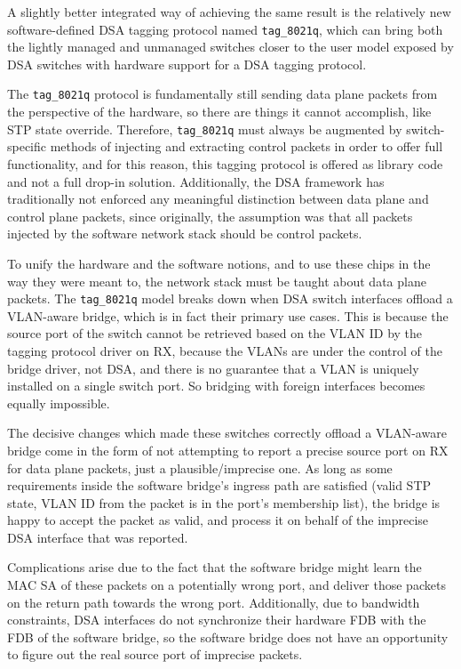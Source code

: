 \documentclass[letterpaper]{article}
\begin{document}
A slightly better integrated way of achieving the same result is the relatively
new software-defined DSA tagging protocol named \verb|tag_8021q|, which can
bring both the lightly managed and unmanaged switches closer to the user model
exposed by DSA switches with hardware support for a DSA tagging protocol.

The \verb|tag_8021q| protocol is fundamentally still sending data plane packets
from the perspective of the hardware, so there are things it cannot accomplish,
like STP state override. Therefore, \verb|tag_8021q| must always be augmented
by switch-specific methods of injecting and extracting control packets in order
to offer full functionality, and for this reason, this tagging protocol is
offered as library code and not a full drop-in solution. Additionally, the DSA
framework has traditionally not enforced any meaningful distinction between
data plane and control plane packets, since originally, the assumption was that
all packets injected by the software network stack should be control packets.

To unify the hardware and the software notions, and to use these chips in the
way they were meant to, the network stack must be taught about data plane
packets. The \verb|tag_8021q| model breaks down when DSA switch interfaces
offload a VLAN-aware bridge, which is in fact their primary use cases. This is
because the source port of the switch cannot be retrieved based on the VLAN ID
by the tagging protocol driver on RX, because the VLANs are under the control
of the bridge driver, not DSA, and there is no guarantee that a VLAN is
uniquely installed on a single switch port. So bridging with foreign interfaces
becomes equally impossible.

The decisive changes which made these switches correctly offload a VLAN-aware
bridge come in the form of not attempting to report a precise source port on RX
for data plane packets, just a plausible/imprecise one. As long as some
requirements inside the software bridge's ingress path are satisfied (valid STP
state, VLAN ID from the packet is in the port's membership list), the bridge is
happy to accept the packet as valid, and process it on behalf of the imprecise
DSA interface that was reported.

Complications arise due to the fact that the software bridge might learn the
MAC SA of these packets on a potentially wrong port, and deliver those packets
on the return path towards the wrong port. Additionally, due to bandwidth
constraints, DSA interfaces do not synchronize their hardware FDB with the FDB
of the software bridge, so the software bridge does not have an opportunity to
figure out the real source port of imprecise packets.
\end{document}
